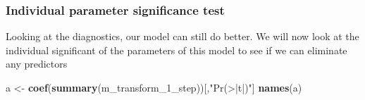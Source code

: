 \documentclass[
]{article}
\newenvironment{Shaded}{\begin{snugshade}}{\end{snugshade}}
\newcommand{\DecValTok}[1]{\textcolor[rgb]{0.00,0.00,0.81}{#1}}
\newcommand{\KeywordTok}[1]{\textcolor[rgb]{0.13,0.29,0.53}{\textbf{#1}}}
\newcommand{\NormalTok}[1]{#1}
\newcommand{\StringTok}[1]{\textcolor[rgb]{0.31,0.60,0.02}{#1}}
\begin{document}
\hypertarget{individual-parameter-significance-test}{%
\subsubsection{Individual parameter significance test}\label{individual-parameter-significance-test}}

Looking at the diagnostics, our model can still do better. We will now look at the individual significant of the parameters of this model to see if we can eliminate any predictors

\begin{Shaded}
\begin{Highlighting}[]
\NormalTok{a <-}\StringTok{ }\KeywordTok{coef}\NormalTok{(}\KeywordTok{summary}\NormalTok{(m_transform_}\DecValTok{1}\NormalTok{_step))[,}\StringTok{"Pr(>|t|)"}\NormalTok{] }
\KeywordTok{names}\NormalTok{(a)}
\end{Highlighting}
\end{Shaded}
\end{document}
